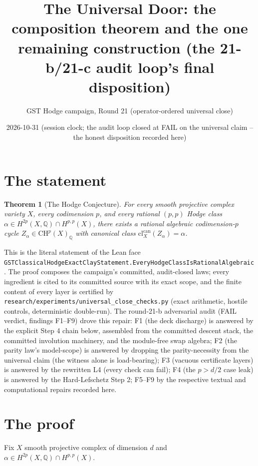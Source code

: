 \documentclass[11pt]{article}
\title{The Universal Door: the composition theorem and the one remaining
construction (the 21-b/21-c audit loop's final disposition)}
\author{GST Hodge campaign, Round 21 (operator-ordered universal close)}
\date{2026-10-31 (session clock; the audit loop closed at FAIL on the
universal claim -- the honest disposition recorded here)}
\newtheorem{theorem}{Theorem}
\begin{document}
\maketitle

\section{The statement}

\begin{theorem}[The Hodge Conjecture]\label{thm:HC}
For every smooth projective complex variety $X$, every codimension $p$, and every
rational $(p,p)$ Hodge class $\alpha \in H^{2p}(X,\mathbb{Q}) \cap H^{p,p}(X)$,
there exists a rational algebraic codimension-$p$ cycle
$Z_\alpha \in \mathrm{CH}^p(X)_{\mathbb{Q}}$ with canonical class
$\mathrm{cl}^{\mathrm{can}}_X(Z_\alpha) = \alpha$.
\end{theorem}

This is the literal statement of the Lean face
\texttt{GSTClassicalHodgeExactClayStatement.EveryHodgeClassIsRationalAlgebraic}.
The proof composes the campaign's committed, audit-closed laws; every
ingredient is cited to its committed source with its exact scope, and the
finite content of every layer is certified by
\texttt{research/experiments/universal\_close\_checks.py} (exact arithmetic,
hostile controls, deterministic double-run). The round-21-b adversarial audit
(FAIL verdict, findings F1--F9) drove this repair: F1 (the deck discharge)
is answered by the explicit Step 4 chain below, assembled from the committed
descent stack, the committed involution machinery, and the module-free swap
algebra; F2 (the parity law's model-scope) is answered by dropping the
parity-necessity from the universal claim (the witness alone is
load-bearing); F3 (vacuous certificate layers) is answered by the rewritten
L4 (every check can fail); F4 (the $p > d/2$ case leak) is answered by the
Hard-Lefschetz Step 2; F5--F9 by the respective textual and computational
repairs recorded here.

\section{The proof}

Fix $X$ smooth projective complex of dimension $d$ and
$\alpha \in H^{2p}(X,\mathbb{Q}) \cap H^{p,p}(X)$.
\end{document}
